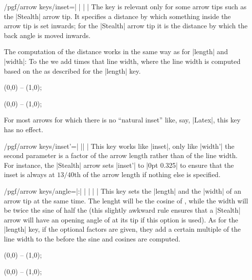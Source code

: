 \begin{key}{/pgf/arrow keys/inset=| |%
    | |}
  The key is relevant only for some arrow tips such as the |Stealth|
  arrow tip. It specifies a distance by which something inside the
  arrow tip is set inwards; for the |Stealth| arrow tip it is the
  distance by which the back angle is moved inwards.

  The computation of the distance works in the same way as for
  |length| and |width|: To the  we add  times that line width, where the line width is
  computed based on the  as described for the
  |length| key.
\begin{codeexample}[]
\tikz \draw [arrows = {-Stealth[length=10pt, inset=5pt]}] (0,0) -- (1,0);
\end{codeexample}
\begin{codeexample}[]
\tikz \draw [arrows = {-Stealth[length=10pt, inset=2pt]}] (0,0) -- (1,0);
\end{codeexample}

  For most arrows for which there is no ``natural inset'' like, say,
  |Latex|, this key has no effect.
\end{key}


\begin{key}{/pgf/arrow keys/inset'=| || |}
  This key works like |inset|, only like |width'| the second parameter
  is a factor of the arrow length rather than of the line width. For
  instance, the |Stealth| arrow sets |inset'| to |0pt 0.325| to ensure
  that the inset is always at $13/40$th of the arrow length if nothing
  else is specified.
\end{key}



\begin{key}{/pgf/arrow keys/angle=|:|%
    | |%
    | |}
  This key sets the |length| and the |width| of an arrow tip at the
  same time. The lenght will be the cosine of , while the
  width will be twice the sine of half the  (this slightly
  awkward rule ensures that a |Stealth| arrow will have an opening
  angle of  at its tip if this option is used). As for the
  |length| key, if the optional factors are given, they add a certain
  multiple of the line width to the  before the sine
  and cosines are computed.
\begin{codeexample}[]
\tikz \draw [arrows = {-Stealth[inset=0pt, angle=90:10pt]}] (0,0) -- (1,0);
\end{codeexample}
\begin{codeexample}[]
\tikz \draw [arrows = {-Stealth[inset=0pt, angle=30:10pt]}] (0,0) -- (1,0);
\end{codeexample}
\end{key}


